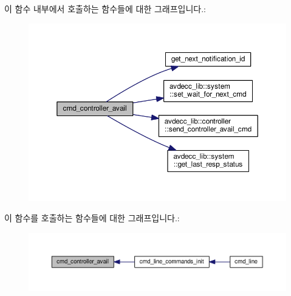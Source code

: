 이 함수 내부에서 호출하는 함수들에 대한 그래프입니다.\+:
\nopagebreak
\begin{figure}[H]
\begin{center}
\leavevmode
\includegraphics[width=350pt]{classcmd__line_a4ed4eea2b99a68cc53dcc9e503ac7844_cgraph}
\end{center}
\end{figure}




이 함수를 호출하는 함수들에 대한 그래프입니다.\+:
\nopagebreak
\begin{figure}[H]
\begin{center}
\leavevmode
\includegraphics[width=350pt]{classcmd__line_a4ed4eea2b99a68cc53dcc9e503ac7844_icgraph}
\end{center}
\end{figure}


